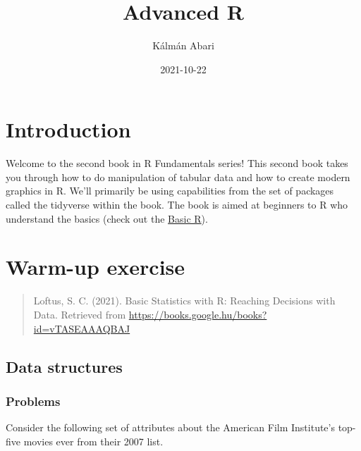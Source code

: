 \documentclass[
]{book}
\title{Advanced R}
\author{Kálmán Abari}
\date{2021-10-22}
\begin{document}
\maketitle

{
\setcounter{tocdepth}{1}
\tableofcontents
}
\hypertarget{introduction}{%
\chapter{Introduction}\label{introduction}}

Welcome to the second book in R Fundamentals series! This second book takes you through how to do manipulation of tabular data and how to create modern graphics in R. We'll primarily be using capabilities from the set of packages called the tidyverse within the book. The book is aimed at beginners to R who understand the basics (check out the \href{https://abarik.github.io/basicr_2020_21_2/}{Basic R}).

\hypertarget{warm-up-exercise}{%
\chapter{Warm-up exercise}\label{warm-up-exercise}}

\begin{quote}
Loftus, S. C. (2021). Basic Statistics with R: Reaching Decisions with Data. Retrieved from \url{https://books.google.hu/books?id=vTASEAAAQBAJ}
\end{quote}

\hypertarget{data-structures}{%
\section{Data structures}\label{data-structures}}

\hypertarget{problems}{%
\subsection{Problems}\label{problems}}

Consider the following set of attributes about the American Film Institute's top-five movies ever from their 2007 list.
\end{document}
